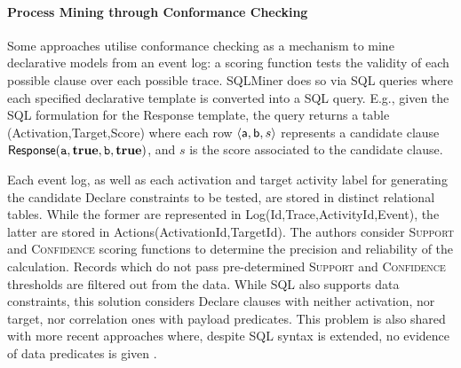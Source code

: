 \paragraph*{Process Mining through Conformance Checking}
Some approaches utilise conformance checking as a mechanism to mine declarative {models}  from an event log: a scoring function tests %
the validity of each possible clause over each possible trace. %
SQLMiner \cite{SchonigRCJM16} {does so via} SQL queries \cite{Schonig15} {where e}ach specified declarative {template} %
{is} converted into a SQL query. E.g., given the SQL formulation for the \textsf{Response} template, the query returns a table \textsf{(Activation,Target,Score)} where each row $\braket{\textsf{a},\textsf{b},s}$ represents a candidate clause $\textsf{Response}(\texttt{a},\textbf{true},\texttt{b},\textbf{true})$, and $s$ is the  score associated to the candidate clause.

Each event log, as well as each activation and target activity label for generating the candidate Declare constraints to be tested, are stored in distinct relational tables. While the former are represented in  \textsf{Log(Id,Trace,ActivityId,Event)}, the latter are stored in \textsf{Actions(ActivationId,TargetId)}. The authors consider 
\textsc{Support} and \textsc{Confidence} scoring functions to determine the precision and reliability of the calculation. Records which do not pass pre-determined \textsc{Support} and \textsc{Confidence} thresholds are filtered out from the data. While SQL also supports data constraints, this solution considers Declare clauses with neither activation, nor target, %
nor correlation ones with payload predicates. This problem is also shared with  more recent approaches where, despite SQL syntax is extended, no evidence of data predicates is given \cite{Polyvyanyy2022}. 

